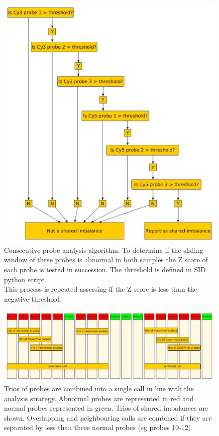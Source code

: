 \begin{figure}
\centering
\includegraphics[width=0.7\linewidth]{./Figures/consecutiveprobeanalysis}
\caption[Consecutive probe analysis algorithm]{Consecutive probe analysis algorithm. To determine if the sliding window of three probes is abnormal in both samples the Z score of each probe is tested in succession. The threshold is defined in SID python script.\\
This process is repeated assessing if the Z score is less than the negative threshold.}
\label{fig:consecutiveprobeanalysis}
\end{figure}

\begin{figure}
\centering
\includegraphics[width=1\linewidth]{./Figures/combiningtrioofprobes}
\caption[Trios of abnormal probes are combined into a single call ]{Trios of probes are combined into a single call in line with the analysis strategy. Abnormal probes are represented in red and normal probes represented in green. Trios of shared imbalances are shown. Overlapping and neighbouring calls are combined if they are separated by less than three normal probes (eg probes 10-12).}
\label{fig:combiningtrioofprobes}
\end{figure}

